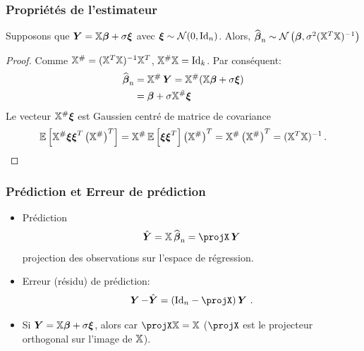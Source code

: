 \begin{frame}
\frametitle{Propriétés de l'estimateur}
\begin{theo}
Supposons que   $\operatorname{\boldsymbol{Y}}= \mathbb{X} \boldsymbol{\beta} + \sigma \boldsymbol{\xi}$ avec $\boldsymbol{\xi} \sim \mathcal{N}(0, \mathrm{Id}_{n})$.
Alors, $\operatorname{\widehat{\boldsymbol{\beta}}_n} \sim \mathcal{N}\left(\boldsymbol{\beta},\sigma^2(\mathbb{X}^T \mathbb{X})^{-1}\right)$
\end{theo}
\begin{proof}
Comme $\mathbb{X}^{\#}= (\mathbb{X}^T \mathbb{X})^{-1} \mathbb{X}^T$, $\mathbb{X}^{\#} \mathbb{X} = \mathrm{Id}_{k}$. Par conséquent:
\begin{align*}
\operatorname{\widehat{\boldsymbol{\beta}}_n}
&= \mathbb{X}^{\#} \operatorname{\boldsymbol{Y}} = \mathbb{X}^{\#} (\mathbb{X} \boldsymbol{\beta} + \sigma \boldsymbol{\xi}) \\
&= \boldsymbol{\beta} + \sigma \mathbb{X}^{\#} \boldsymbol{\xi}
\end{align*}
Le vecteur $\mathbb{X}^{\#} \boldsymbol{\xi}$ est Gaussien centré de matrice de covariance
\[
\operatorname{{\mathbb E}}\left[ \mathbb{X}^{\#} \boldsymbol{\xi} \boldsymbol{\xi}^T \left( \mathbb{X}^{\#} \right)^T \right] =
\mathbb{X}^{\#} \operatorname{{\mathbb E}}\left[ \boldsymbol{\xi} \boldsymbol{\xi}^T \right] \left( \mathbb{X}^{\#} \right)^T  = \mathbb{X}^{\#} \left( \mathbb{X}^{\#} \right)^T = (\mathbb{X}^T \mathbb{X})^{-1} \,.
\]
\end{proof}
\end{frame}


\begin{frame}
\frametitle{Prédiction et Erreur de prédiction}
\begin{itemize}
\item \alert{Prédiction}
\[
\predY= \regressmat \estregress = \projX \bY
\]
projection des observations sur l'espace de régression.
\item \alert{Erreur (résidu) de prédiction}:
\[
\bY - \predY = (\Id{n} - \projX) \bY \eqsp.
\]
\item Si  $\operatorname{\boldsymbol{Y}}= \mathbb{X} \boldsymbol{\beta} +  \sigma \boldsymbol{\xi}$, alors 
car $\projX \regressmat= \regressmat$ ($\projX$ est le projecteur orthogonal sur l'image de $\mathbb{X}$).
\end{itemize}
\end{frame}


